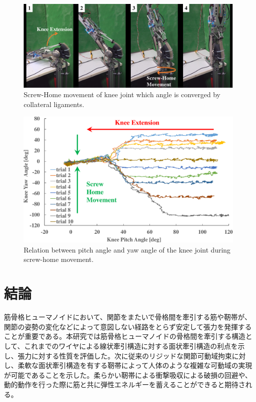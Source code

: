 \documentclass{jarticle}
\begin{document}
\begin{figure}[tb]
 \centering
  \includegraphics[width=1.0\textwidth]{figs/screw-home.pdf}
  \vspace*{-4mm}
  \caption{Screw-Home movement of knee joint which angle is converged by collateral ligaments.}
  \label{fig:shm}
\end{figure}

\begin{figure}[tb]
 \centering
  \includegraphics[width=1.0\columnwidth]{figs/screw-home-convergence.pdf}
  \vspace*{-4mm}
  \caption{Relation between pitch angle and yaw angle of the knee joint during screw-home movement.}
  \label{fig:shm-graph}
\end{figure}

\section{結論}
筋骨格ヒューマノイドにおいて、関節をまたいで骨格間を牽引する筋や靭帯が、関節の姿勢の変化などによって意図しない経路をとらず安定して張力を発揮することが重要である。本研究では筋骨格ヒューマノイドの骨格間を牽引する構造として、これまでのワイヤによる線状牽引構造に対する面状牽引構造の利点を示し、張力に対する性質を評価した。次に従来のリジッドな関節可動域拘束に対し、柔軟な面状牽引構造を有する靭帯によって人体のような複雑な可動域の実現が可能であることを示した。柔らかい靭帯による衝撃吸収による破損の回避や、動的動作を行った際に筋と共に弾性エネルギーを蓄えることができると期待される。
\end{document}
